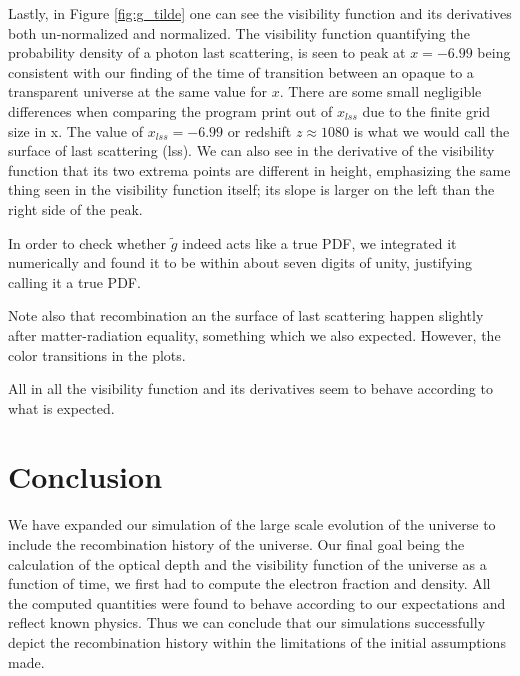 \documentclass[twocolumn]{aastex62}
\begin{document}
Lastly, in Figure \ref{fig:g_tilde} one can see the visibility function and its derivatives both un-normalized and normalized. The visibility function quantifying the probability density of a photon last scattering, is seen to peak at $x = -6.99$ being consistent with our finding of the time of transition between an opaque to a transparent universe at the same value for $x$. There are some small negligible differences when comparing the program print out of $x_{lss}$ due to the finite grid size in x. The value of $x_{lss} = -6.99$ or redshift $z \approx 1080$ is what we would call the surface of last scattering (lss). We can also see in the derivative of the visibility function that its two extrema points are different in height, emphasizing the same thing seen in the visibility function itself; its slope is larger on the left than the right side of the peak. 

In order to check whether $\tilde{g}$ indeed acts like a true PDF, we integrated it numerically and found it to be within about seven digits of unity, justifying calling it a true PDF.

Note also that recombination an the surface of last scattering happen slightly after matter-radiation equality, something which we also expected. However, the color transitions in the plots.

All in all the visibility function and its derivatives seem to behave according to what is expected.

\section{Conclusion} \label{sec:Conclusion}
We have expanded our simulation of the large scale evolution of the universe to include the recombination history of the universe. Our final goal being the calculation of the optical depth and the visibility function of the universe as a function of time, we first had to compute the electron fraction and density. All the computed quantities were found to behave according to our expectations and reflect known physics. Thus we can conclude that our simulations successfully depict the recombination history within the limitations of the initial assumptions made.



\end{document}

